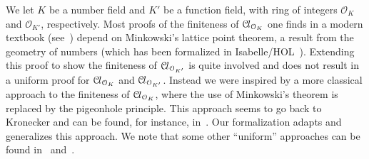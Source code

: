 \documentclass[a4paper,USenglish,cleveref, autoref, thm-restate]{lipics-v2021}
\newcommand*{\OK}[1][K]{\mathcal{O}_{#1}}
\newcommand*{\Cl}{\mathcal{C}\kern-.075em l}
\newcommand{\mathlib}{\textsf{mathlib}\xspace}
\begin{document}
We let $K$ be a number field and $K'$ be a function field, with ring of integers $\OK$ and $\OK[K']$, respectively. 
Most proofs of the finiteness of $\Cl_{\OK}$ one finds in a modern textbook (see~\cite[Theorems 4.4,~5.3,~6.3]{Neukirch}) depend on Minkowski's lattice point theorem, a result from the geometry of numbers (which has been formalized in Isabelle/HOL~\cite{Minkowskis_Theorem-AFP}).
Extending this proof to show the finiteness of $\Cl_{\OK[K']}$ is quite involved and does not result in a uniform proof for $\Cl_{\OK}$ and $\Cl_{\OK[K']}$.
Instead we were inspired by a more classical approach to the finiteness of $\Cl_{\OK}$, where the use of Minkowski's theorem is replaced by the pigeonhole principle. This approach seems to go back to Kronecker
and can be found, for instance, in~\cite{Ireland-Rosen}.
Our formalization adapts and generalizes this approach.
We note that some other ``uniform'' approaches can be found in~\cite{Artin-Whaples} and~\cite{Stasinski}.
\end{document}

